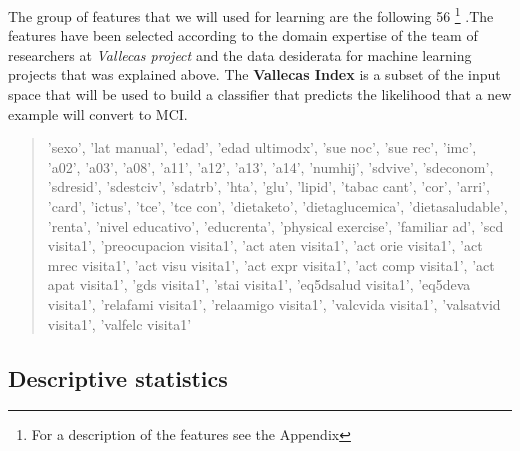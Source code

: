 \documentclass[11pt]{article}
\theoremstyle{definition}
\theoremstyle{remark}
\begin{document}
The group of features that we will used for learning are the following 56 \footnote{For a description of the features see the Appendix} .The features have been selected according to the domain expertise of the team of researchers at \emph{Vallecas project} and the data desiderata for machine learning projects that was explained above. The \textbf{Vallecas Index} is a subset of the input space that will be used to build a classifier that predicts the likelihood that a new example will convert to MCI. 
\begin{quote}
'sexo', 'lat manual', 'edad', 'edad ultimodx', 'sue noc', 'sue rec', 'imc', 'a02', 'a03', 'a08', 'a11', 'a12', 'a13', 'a14', 'numhij', 'sdvive', 'sdeconom', 'sdresid', 'sdestciv', 'sdatrb', 'hta', 'glu', 'lipid', 'tabac cant', 'cor', 'arri', 'card', 'ictus', 'tce', 'tce con', 'dietaketo', 'dietaglucemica', 'dietasaludable', 'renta', 'nivel educativo', 'educrenta', 'physical exercise', 'familiar ad', 'scd visita1', 'preocupacion visita1', 'act aten visita1', 'act orie visita1', 'act mrec visita1', 'act visu visita1', 'act expr visita1', 'act comp visita1', 'act apat visita1', 'gds visita1', 'stai visita1', 'eq5dsalud visita1', 'eq5deva visita1', 'relafami visita1', 'relaamigo visita1', 'valcvida visita1', 'valsatvid visita1', 'valfelc visita1'
\end{quote}

\subsection{Descriptive statistics}
\label{sse:des}
\end{document}
